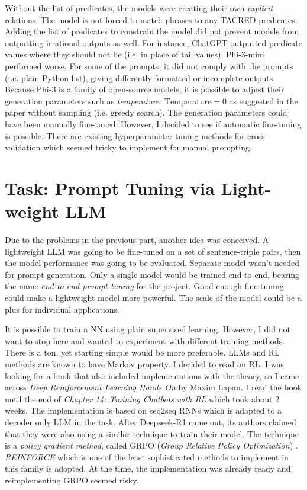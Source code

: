 \documentclass{article}
\begin{document}
Without the list of predicates, the models were creating their own \textit{explicit} relations. The model is not forced to match phrases to any TACRED predicates. Adding the list of predicates to constrain the model did not prevent models from outputting irrational outputs as well. For instance, ChatGPT outputted predicate values where they should not be (i.e. in place of tail values). Phi-3-mini performed worse. For some of the prompts, it did not comply with the prompts (i.e. plain Python list), giving differently formatted or incomplete outputs. Because Phi-3 is a family of open-source models, it is possible to adjust their generation parameters such as \textit{temperature}. $\text{Temperature}=0$ as suggested in the paper without sampling (i.e. greedy search). The generation parameters could have been manually fine-tuned. However, I decided to see if automatic fine-tuning is possible. There are existing hyperparameter tuning methods for cross-validation which seemed tricky to implement for manual prompting. 

\section{Task: Prompt Tuning via Light-weight LLM}

Due to the problems in the previous part, another idea was conceived. A lightweight LLM was going to be fine-tuned on a set of sentence-triple pairs, then the model performance was going to be evaluated. Separate model wasn't needed for prompt generation. Only a single model would be trained end-to-end, bearing the name \textit{end-to-end prompt tuning} for the project. Good enough fine-tuning could make a lightweight model more powerful. The scale of the model could be a plus for individual applications.

It is possible to train a NN using plain supervised learning. However, I did not want to stop here and wanted to experiment with different training methods. There is a ton, yet starting simple would be more preferable. LLMs and RL methods are known to have Markov property. I decided to read on RL. I was looking for a book that also included implementations with the theory, so I came across \textit{Deep Reinforcement Learning Hands On} by Maxim Lapan. I read the book until the end of \textit{Chapter 14: Training Chatbots with RL} which took about 2 weeks. The implementation is based on seq2seq RNNs which is adapted to a decoder only LLM in the task. After Deepseek-R1 came out, its authors claimed that they were also using a similar technique to train their model. The technique is a \textit{policy gradient method}, called GRPO (\textit{Group
Relative Policy Optimization}) \cite{deepseek-ai_deepseek-r1_2025, shao_deepseekmath_2024, schulman_proximal_2017}. \textit{REINFORCE} which is one of the least sophisticated methods to implement in this family is adopted. At the time, the implementation was already ready and reimplementing GRPO seemed risky.
\end{document}
